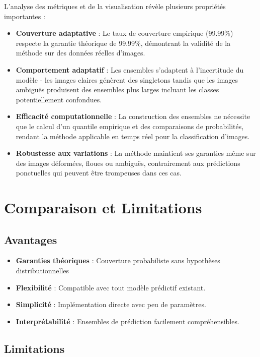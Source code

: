 \documentclass[a4paper,12pt]{article}
\begin{document}
L'analyse des métriques et de la visualisation révèle plusieurs propriétés importantes :

\begin{itemize}
\item \textbf{Couverture adaptative} : Le taux de couverture empirique (99.99\%) respecte la garantie théorique de 99.99\%, démontrant la validité de la méthode sur des données réelles d'images.

\item \textbf{Comportement adaptatif} : Les ensembles s'adaptent à l'incertitude du modèle - les images claires génèrent des singletons tandis que les images ambiguës produisent des ensembles plus larges incluant les classes potentiellement confondues.

\item \textbf{Efficacité computationnelle} : La construction des ensembles ne nécessite que le calcul d'un quantile empirique et des comparaisons de probabilités, rendant la méthode applicable en temps réel pour la classification d'images.

\item \textbf{Robustesse aux variations} : La méthode maintient ses garanties même sur des images déformées, floues ou ambiguës, contrairement aux prédictions ponctuelles qui peuvent être trompeuses dans ces cas.
\end{itemize}

\section{Comparaison et Limitations}

\subsection{Avantages}

\begin{itemize}
\item \textbf{Garanties théoriques} : Couverture probabiliste sans hypothèses distributionnelles
\item \textbf{Flexibilité} : Compatible avec tout modèle prédictif existant.
\item \textbf{Simplicité} : Implémentation directe avec peu de paramètres.
\item \textbf{Interprétabilité} : Ensembles de prédiction facilement compréhensibles.
\end{itemize}

\subsection{Limitations}
\end{document}
